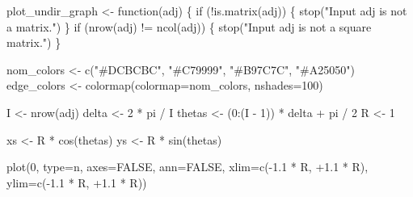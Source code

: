 \documentclass[
  letterpaper,
  DIV=11,
  numbers=noendperiod]{scrartcl}
\newenvironment{Shaded}{\begin{snugshade}}{\end{snugshade}}
\newcommand{\AttributeTok}[1]{\textcolor[rgb]{0.40,0.45,0.13}{#1}}
\newcommand{\ConstantTok}[1]{\textcolor[rgb]{0.56,0.35,0.01}{#1}}
\newcommand{\ControlFlowTok}[1]{\textcolor[rgb]{0.00,0.23,0.31}{#1}}
\newcommand{\DecValTok}[1]{\textcolor[rgb]{0.68,0.00,0.00}{#1}}
\newcommand{\FloatTok}[1]{\textcolor[rgb]{0.68,0.00,0.00}{#1}}
\newcommand{\FunctionTok}[1]{\textcolor[rgb]{0.28,0.35,0.67}{#1}}
\newcommand{\NormalTok}[1]{\textcolor[rgb]{0.00,0.23,0.31}{#1}}
\newcommand{\OtherTok}[1]{\textcolor[rgb]{0.00,0.23,0.31}{#1}}
\newcommand{\SpecialCharTok}[1]{\textcolor[rgb]{0.37,0.37,0.37}{#1}}
\newcommand{\StringTok}[1]{\textcolor[rgb]{0.13,0.47,0.30}{#1}}
\begin{document}
\begin{Shaded}
\begin{Highlighting}[]
\NormalTok{plot\_undir\_graph }\OtherTok{\textless{}{-}} \ControlFlowTok{function}\NormalTok{(adj) \{}
  \ControlFlowTok{if}\NormalTok{ (}\SpecialCharTok{!}\FunctionTok{is.matrix}\NormalTok{(adj)) \{}
    \FunctionTok{stop}\NormalTok{(}\StringTok{"Input adj is not a matrix."}\NormalTok{)}
\NormalTok{  \}}
  \ControlFlowTok{if}\NormalTok{ (}\FunctionTok{nrow}\NormalTok{(adj) }\SpecialCharTok{!=} \FunctionTok{ncol}\NormalTok{(adj)) \{}
    \FunctionTok{stop}\NormalTok{(}\StringTok{"Input adj is not a square matrix."}\NormalTok{)}
\NormalTok{  \}}

\NormalTok{  nom\_colors }\OtherTok{\textless{}{-}} \FunctionTok{c}\NormalTok{(}\StringTok{"\#DCBCBC"}\NormalTok{, }\StringTok{"\#C79999"}\NormalTok{, }\StringTok{"\#B97C7C"}\NormalTok{, }\StringTok{"\#A25050"}\NormalTok{)}
\NormalTok{  edge\_colors }\OtherTok{\textless{}{-}} \FunctionTok{colormap}\NormalTok{(}\AttributeTok{colormap=}\NormalTok{nom\_colors, }\AttributeTok{nshades=}\DecValTok{100}\NormalTok{)}

\NormalTok{  I }\OtherTok{\textless{}{-}} \FunctionTok{nrow}\NormalTok{(adj)}
\NormalTok{  delta }\OtherTok{\textless{}{-}} \DecValTok{2} \SpecialCharTok{*}\NormalTok{ pi }\SpecialCharTok{/}\NormalTok{ I}
\NormalTok{  thetas }\OtherTok{\textless{}{-}}\NormalTok{ (}\DecValTok{0}\SpecialCharTok{:}\NormalTok{(I }\SpecialCharTok{{-}} \DecValTok{1}\NormalTok{)) }\SpecialCharTok{*}\NormalTok{ delta }\SpecialCharTok{+}\NormalTok{ pi }\SpecialCharTok{/} \DecValTok{2}
\NormalTok{  R }\OtherTok{\textless{}{-}} \DecValTok{1}

\NormalTok{  xs }\OtherTok{\textless{}{-}}\NormalTok{ R }\SpecialCharTok{*} \FunctionTok{cos}\NormalTok{(thetas)}
\NormalTok{  ys }\OtherTok{\textless{}{-}}\NormalTok{ R }\SpecialCharTok{*} \FunctionTok{sin}\NormalTok{(thetas)}

  \FunctionTok{plot}\NormalTok{(}\DecValTok{0}\NormalTok{, }\AttributeTok{type=}\StringTok{\textquotesingle{}n\textquotesingle{}}\NormalTok{, }\AttributeTok{axes=}\ConstantTok{FALSE}\NormalTok{, }\AttributeTok{ann=}\ConstantTok{FALSE}\NormalTok{,}
       \AttributeTok{xlim=}\FunctionTok{c}\NormalTok{(}\SpecialCharTok{{-}}\FloatTok{1.1} \SpecialCharTok{*}\NormalTok{ R, }\SpecialCharTok{+}\FloatTok{1.1} \SpecialCharTok{*}\NormalTok{ R), }\AttributeTok{ylim=}\FunctionTok{c}\NormalTok{(}\SpecialCharTok{{-}}\FloatTok{1.1} \SpecialCharTok{*}\NormalTok{ R, }\SpecialCharTok{+}\FloatTok{1.1} \SpecialCharTok{*}\NormalTok{ R))}


\end{Highlighting}
\end{Shaded}
\end{document}
